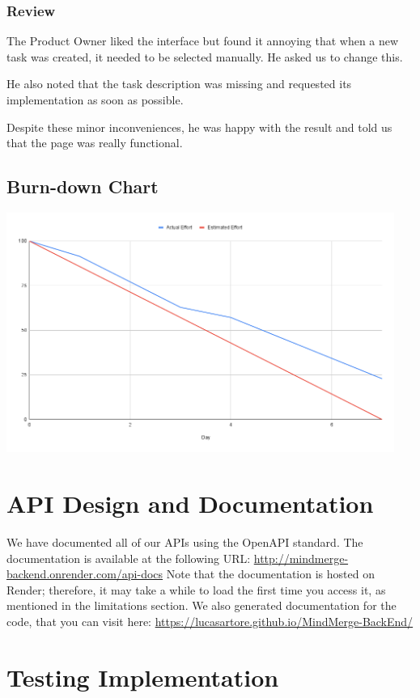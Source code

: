 \documentclass{article}
\begin{document}
\subsubsection{Review}
The Product Owner liked the interface but found it annoying that when a new task was created, it needed to be selected manually. He asked us to change this.

He also noted that the task description was missing and requested its implementation as soon as possible.

Despite these minor inconveniences, he was happy with the result and told us that the page was really functional.
\subsection{Burn-down Chart}
\includegraphics[width=0.95\textwidth]{images/burndown_chart_3.png}

\section{API Design and Documentation}
We have documented all of our APIs using the OpenAPI standard. The documentation is available at the following URL: \url{http://mindmerge-backend.onrender.com/api-docs}
\newline
Note that the documentation is hosted on Render; therefore, it may take a while to load the first time you access it, as mentioned in the limitations section.
\newline
We also generated documentation for the code, that you can visit here: \url{https://lucasartore.github.io/MindMerge-BackEnd/} 
\section{Testing Implementation}
\end{document}

